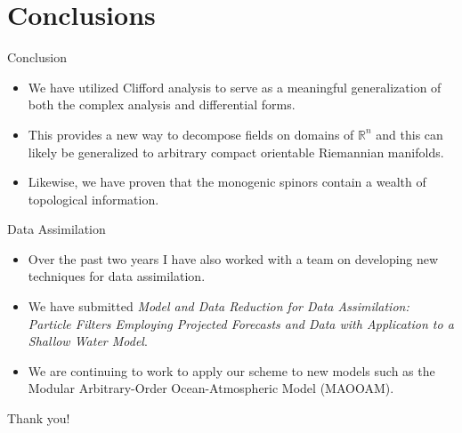 \documentclass[aspectratio=169]{beamer}
\newcommand{\R}{\mathbb{R}}
\begin{document}
\section{Conclusions}

\begin{frame}{Conclusion}
\vfill
\begin{itemize}
\pause
    \item We have utilized Clifford analysis to serve as a meaningful generalization of both the complex analysis and differential forms. 
\pause
    \item This provides a new way to decompose fields on domains of $\R^n$ and this can likely be generalized to arbitrary compact orientable Riemannian manifolds.
\pause
    \item Likewise, we have proven that the monogenic spinors contain a wealth of topological information.
\end{itemize}
\vfill
\end{frame}

\begin{frame}{Data Assimilation}
\vfill
\begin{itemize}
\pause
\item Over the past two years I have also worked with a team on developing new techniques for data assimilation. 
\pause
\item We have submitted \emph{Model and Data Reduction for Data Assimilation: Particle Filters Employing Projected Forecasts and Data with Application to a Shallow Water Model}.
\pause
\item We are continuing to work to apply our scheme to new models such as the Modular Arbitrary-Order Ocean-Atmospheric Model (MAOOAM).
\end{itemize}
\vfill
\end{frame}

\begin{frame}{}
\vfill
\begin{center}
\large Thank you!
\end{center}
\vfill
\end{frame}
\end{document}
